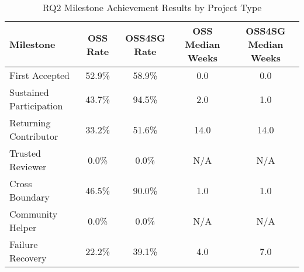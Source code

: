 \begin{table}[h]
\centering
\caption{RQ2 Milestone Achievement Results by Project Type}
\label{tab:rq2_milestone_results}
\begin{tabular}{|l|c|c|c|c|}
\hline
\textbf{Milestone} & \textbf{OSS Rate} & \textbf{OSS4SG Rate} & \textbf{OSS Median Weeks} & \textbf{OSS4SG Median Weeks} \\
\hline
First Accepted & 52.9\% & 58.9\% & 0.0 & 0.0 \\
Sustained Participation & 43.7\% & 94.5\% & 2.0 & 1.0 \\
Returning Contributor & 33.2\% & 51.6\% & 14.0 & 14.0 \\
Trusted Reviewer & 0.0\% & 0.0\% & N/A & N/A \\
Cross Boundary & 46.5\% & 90.0\% & 1.0 & 1.0 \\
Community Helper & 0.0\% & 0.0\% & N/A & N/A \\
Failure Recovery & 22.2\% & 39.1\% & 4.0 & 7.0 \\
\hline
\end{tabular}
\end{table}
